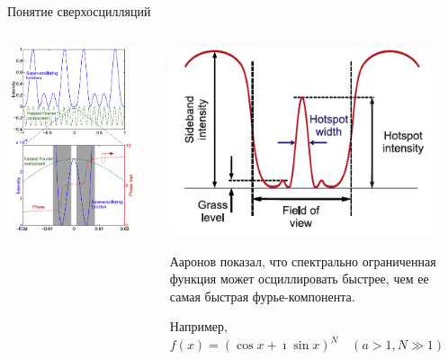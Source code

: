 \documentclass[9pt, compress, xcolor=table]{beamer}
\begin{document}
\begin{frame}{Понятие сверхосцилляций}
\begin{columns}[c]
\column{6.5cm}
\begin{center}
\includegraphics[width=0.9\textwidth]{nh3}
\end{center}
\column{6.5cm}
\begin{center}
\includegraphics[width=0.9\textwidth]{nh4}

Ааронов показал, что спектрально ограниченная функция может осциллировать быстрее, чем ее самая быстрая фурье-компонента.

Например, $f(x)=(\cos x+\imath \sin x)^N\quad(a>1,N\gg1)$
\end{center}
\end{columns}
\end{frame}
\end{document}
